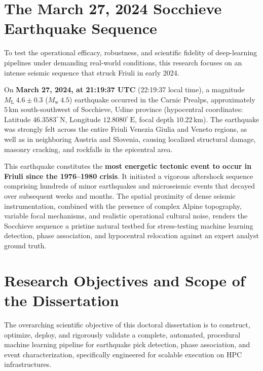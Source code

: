 \section{The March 27, 2024 Socchieve Earthquake Sequence}
\label{sec:socchieve_sequence}

To test the operational efficacy, robustness, and scientific fidelity of deep-learning pipelines under demanding real-world conditions, this research focuses on an intense seismic sequence that struck Friuli in early 2024.

On \textbf{March 27, 2024, at 21:19:37 UTC} (22:19:37 local time), a magnitude $M_{\mathrm{L}}~4.6 \pm 0.3$ ($M_{\mathrm{w}}~4.5$) earthquake occurred in the Carnic Prealps, approximately $5\,\mathrm{km}$ south-southwest of Socchieve, Udine province (hypocentral coordinates: Latitude $46.3583^\circ\,\mathrm{N}$, Longitude $12.8080^\circ\,\mathrm{E}$, focal depth $10.22\,\mathrm{km}$). The earthquake was strongly felt across the entire Friuli Venezia Giulia and Veneto regions, as well as in neighboring Austria and Slovenia, causing localized structural damage, masonry cracking, and rockfalls in the epicentral area.

This earthquake constitutes the \textbf{most energetic tectonic event to occur in Friuli since the 1976--1980 crisis}. It initiated a vigorous aftershock sequence comprising hundreds of minor earthquakes and microseismic events that decayed over subsequent weeks and months. The spatial proximity of dense seismic instrumentation, combined with the presence of complex Alpine topography, variable focal mechanisms, and realistic operational cultural noise, renders the Socchieve sequence a pristine natural testbed for stress-testing machine learning detection, phase association, and hypocentral relocation against an expert analyst ground truth.

\section{Research Objectives and Scope of the Dissertation}
\label{sec:objectives}

The overarching scientific objective of this doctoral dissertation is to construct, optimize, deploy, and rigorously validate a complete, automated, procedural machine learning pipeline for earthquake pick detection, phase association, and event characterization, specifically engineered for scalable execution on \ac{HPC} infrastructures.

